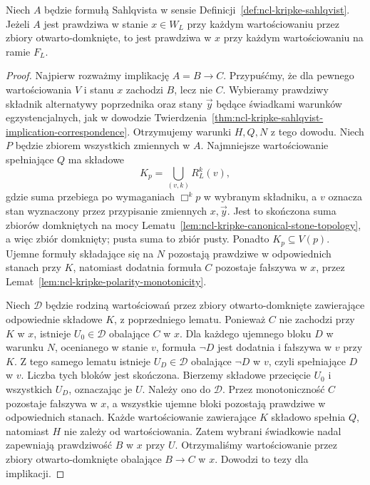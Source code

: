 \begin{twierdzenie}
\label{thm:ncl-kripke-sahlqvist-local-canonicity}
Niech $A$ będzie formułą Sahlqvista w sensie
Definicji~\ref{def:ncl-kripke-sahlqvist}.
Jeżeli $A$ jest prawdziwa w stanie $x\in W_L$
przy każdym wartościowaniu przez zbiory
otwarto-domknięte, to jest prawdziwa w $x$
przy każdym wartościowaniu na ramie $F_L$.
\end{twierdzenie}
\begin{proof}
Najpierw rozważmy implikację $A=B\to C$.
Przypuśćmy, że dla pewnego wartościowania
$V$ i stanu $x$ zachodzi $B$, lecz nie $C$.
Wybieramy prawdziwy składnik alternatywy
poprzednika oraz stany $\vec y$ będące świadkami
warunków egzystencjalnych, jak w dowodzie
Twierdzenia~\ref{thm:ncl-kripke-sahlqvist-implication-correspondence}.
Otrzymujemy warunki $H,Q,N$ z tego dowodu.
Niech $P$ będzie zbiorem wszystkich zmiennych
w $A$. Najmniejsze wartościowanie
spełniające $Q$ ma składowe
\[
 K_p=\bigcup_{(v,k)} R_L^k(v),
\]
gdzie suma przebiega po wymaganiach
$\Box^k p$ w wybranym składniku, a $v$
oznacza stan wyznaczony przez przypisanie
zmiennych $x,\vec y$.
Jest to skończona suma zbiorów domkniętych
na mocy Lematu~\ref{lem:ncl-kripke-canonical-stone-topology},
a więc zbiór domknięty; pusta suma to
zbiór pusty. Ponadto $K_p\subseteq V(p)$.
Ujemne formuły składające się na $N$
pozostają prawdziwe w odpowiednich stanach
przy $K$, natomiast dodatnia formuła $C$
pozostaje fałszywa w $x$, przez
Lemat~\ref{lem:ncl-kripke-polarity-monotonicity}.

Niech $\mathcal D$ będzie rodziną
wartościowań przez zbiory otwarto-domknięte
zawierające odpowiednie składowe $K$,
z poprzedniego lematu.
Ponieważ $C$ nie zachodzi przy $K$ w $x$,
istnieje $U_0\in\mathcal D$ obalające $C$
w $x$. Dla każdego ujemnego bloku $D$
w warunku $N$, ocenianego w stanie $v$,
formuła $\neg D$ jest dodatnia i fałszywa
w $v$ przy $K$. Z tego samego lematu
istnieje $U_D\in\mathcal D$ obalające
$\neg D$ w $v$, czyli spełniające $D$ w $v$.
Liczba tych bloków jest skończona.
Bierzemy składowe przecięcie $U_0$
i wszystkich $U_D$, oznaczając je $U$.
Należy ono do $\mathcal D$.
Przez monotoniczność $C$ pozostaje
fałszywa w $x$, a wszystkie ujemne bloki
pozostają prawdziwe w odpowiednich stanach.
Każde wartościowanie zawierające $K$ składowo
spełnia $Q$,
natomiast $H$ nie zależy od wartościowania.
Zatem wybrani świadkowie nadal zapewniają
prawdziwość $B$ w $x$ przy $U$.
Otrzymaliśmy wartościowanie przez zbiory
otwarto-domknięte obalające $B\to C$ w $x$.
Dowodzi to tezy dla implikacji.


\end{proof}
